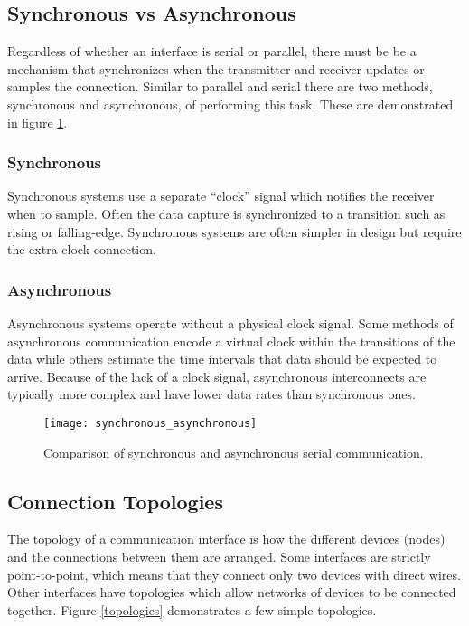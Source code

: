 \documentclass[11pt,fleqn]{book} %
\begin{document}
\subsection{Synchronous vs Asynchronous}

Regardless of whether an interface is serial or parallel, there must be be a mechanism that synchronizes when the transmitter and receiver updates or samples the connection. Similar to parallel and serial there are two methods, synchronous and asynchronous, of performing this task. These are demonstrated in figure \ref{synchronous_asynchronous}.

\subsubsection{Synchronous} 
Synchronous systems use a separate ``clock'' signal which notifies the receiver when to sample.  Often the data capture is synchronized to a transition such as rising or falling-edge. Synchronous systems are often simpler in design but require the extra clock connection.

\subsubsection{Asynchronous}
Asynchronous systems operate without a physical clock signal. Some methods of asynchronous communication encode a virtual clock within the transitions of the data while others estimate the time intervals that data should be expected to arrive. Because of the lack of a clock signal, asynchronous interconnects are typically more complex and have lower data rates than synchronous ones. 

\begin{figure}[]
    \centering\texttt{[image: synchronous\_asynchronous]}
    \caption{Comparison of synchronous and asynchronous serial communication.}
    \label{synchronous_asynchronous}
\end{figure}

\subsection{Connection Topologies} 
The topology of a communication interface is how the different devices (nodes) and the connections between them are arranged. Some interfaces are strictly point-to-point, which means that they connect only two devices with direct wires. Other interfaces have topologies which allow networks of devices to be connected together. Figure \ref{topologies} demonstrates a few simple topologies. 
\end{document}
